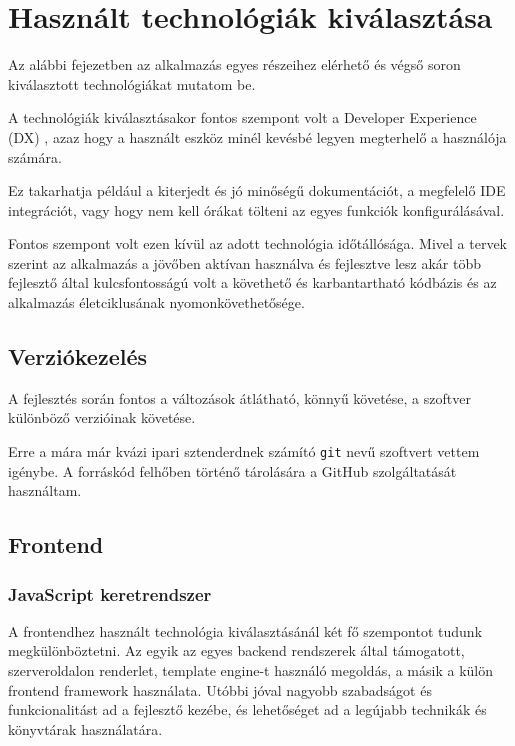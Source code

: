 \chapter{Használt technológiák kiválasztása}

Az alábbi fejezetben az alkalmazás egyes részeihez elérhető és végső soron kiválasztott technológiákat mutatom be.

A technológiák kiválasztásakor fontos szempont volt a Developer Experience (DX) \cite{DX}, azaz hogy a használt eszköz minél kevésbé legyen megterhelő a használója számára.

Ez takarhatja például a kiterjedt és jó minőségű dokumentációt, a megfelelő IDE integrációt, vagy hogy nem kell órákat tölteni az egyes funkciók konfigurálásával.

Fontos szempont volt ezen kívül az adott technológia időtállósága. Mivel a tervek szerint az alkalmazás a jövőben aktívan használva és fejlesztve
lesz akár több fejlesztő által kulcsfontosságú volt a követhető és karbantartható kódbázis és az alkalmazás életciklusának nyomonkövethetősége.

\section{Verziókezelés}

A fejlesztés során fontos a változások átlátható, könnyű követése, a szoftver különböző verzióinak követése.

Erre a mára már kvázi ipari sztenderdnek számító \lstinline|git| nevű szoftvert vettem igénybe. A forráskód felhőben
történő tárolására a GitHub szolgáltatását használtam.

\section{Frontend}
\subsection{JavaScript keretrendszer}
A frontendhez használt technológia kiválasztásánál két fő szempontot tudunk megkülönböztetni.
Az egyik az egyes backend rendszerek által támogatott, szerveroldalon renderlet, template engine-t használó megoldás, a másik a külön frontend framework használata.
Utóbbi jóval nagyobb szabadságot és funkcionalitást ad a fejlesztő kezébe, és lehetőséget ad a legújabb technikák és könyvtárak használatára.

